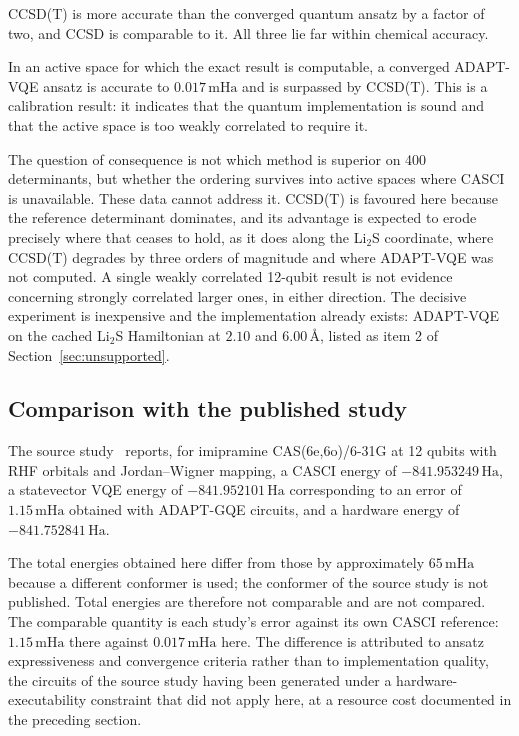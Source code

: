 \documentclass[11pt,a4paper]{article}
\newcommand{\mHa}{\ensuremath{\,\mathrm{mHa}}}
\newcommand{\Ha}{\ensuremath{\,\mathrm{Ha}}}
\newcommand{\Ang}{\ensuremath{\,\text{\AA}}}
\newcommand{\LiS}{\texorpdfstring{Li$_2$S}{Li2S}}
\begin{document}
CCSD(T) is more accurate than the converged quantum ansatz by a factor of two,
and CCSD is comparable to it. All three lie far within chemical accuracy.

\begin{result}
In an active space for which the exact result is computable, a converged
ADAPT-VQE ansatz is accurate to $0.017\mHa$ and is surpassed by CCSD(T). This
is a calibration result: it indicates that the quantum implementation is sound
and that the active space is too weakly correlated to require it.
\end{result}

\begin{unsupported}
The question of consequence is not which method is superior on 400
determinants, but whether the ordering survives into active spaces where CASCI
is unavailable. These data cannot address it. CCSD(T) is favoured here because
the reference determinant dominates, and its advantage is expected to erode
precisely where that ceases to hold, as it does along the \LiS{} coordinate,
where CCSD(T) degrades by three orders of magnitude and where ADAPT-VQE was not
computed. A single weakly correlated 12-qubit result is not evidence concerning
strongly correlated larger ones, in either direction. The decisive experiment
is inexpensive and the implementation already exists: ADAPT-VQE on the cached
\LiS{} Hamiltonian at $2.10$ and $6.00\Ang$, listed as item 2 of
Section~\ref{sec:unsupported}.
\end{unsupported}

\subsection{Comparison with the published study}
\label{sec:A:published}

The source study~\cite{koziell} reports, for imipramine CAS(6e,6o)/6-31G at 12
qubits with RHF orbitals and Jordan--Wigner mapping, a CASCI energy of
$-841.953249\Ha$, a statevector VQE energy of $-841.952101\Ha$ corresponding to
an error of $1.15\mHa$ obtained with ADAPT-GQE circuits, and a hardware energy
of $-841.752841\Ha$.

The total energies obtained here differ from those by approximately $65\mHa$
because a different conformer is used; the conformer of the source study is not
published. Total energies are therefore not comparable and are not compared.
The comparable quantity is each study's error against its own CASCI reference:
$1.15\mHa$ there against $0.017\mHa$ here. The difference is attributed to
ansatz expressiveness and convergence criteria rather than to implementation
quality, the circuits of the source study having been generated under a
hardware-executability constraint that did not apply here, at a resource cost
documented in the preceding section.
\end{document}

